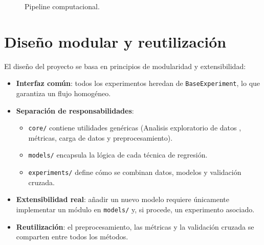 \documentclass[12pt,a4paper]{report}
\begin{document}
\begin{figure}[!htbp]
\centering


\caption{Pipeline computacional.}
\label{fig:pipeline_computacional}
\end{figure}



\section{Diseño modular y reutilización}

El diseño del proyecto se basa en principios de modularidad y extensibilidad:

\begin{itemize}

\item \textbf{Interfaz común}: todos los experimentos heredan de \texttt{BaseExperiment}, lo que garantiza un flujo homogéneo.

\item \textbf{Separación de responsabilidades}:
\begin{itemize}
    \item \texttt{core/} contiene utilidades genéricas (Analisis exploratorio de datos , métricas, carga de datos y preprocesamiento).
    
    \item \texttt{models/} encapsula la lógica de cada técnica de regresión.
    
    \item \texttt{experiments/} define cómo se combinan datos, modelos y validación cruzada.
\end{itemize}

\item \textbf{Extensibilidad real}: añadir un nuevo modelo requiere únicamente implementar un módulo en \texttt{models/} y, si procede, un experimento asociado.

\item \textbf{Reutilización}: el preprocesamiento, las métricas y la validación cruzada se comparten entre todos los métodos.

\end{itemize}
\end{document}

